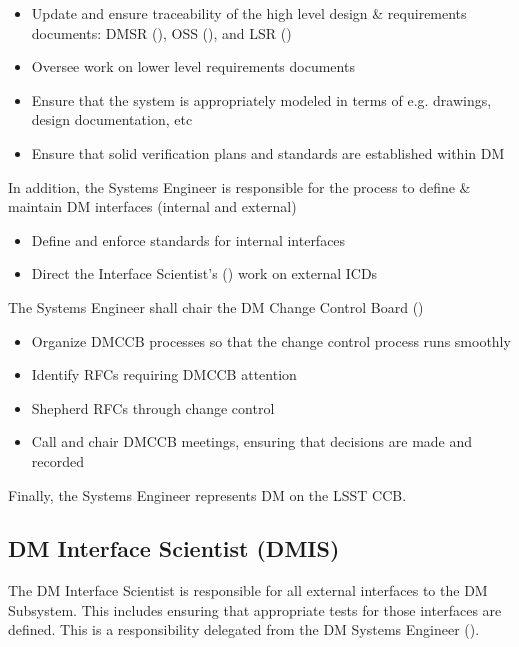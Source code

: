 \begin{itemize}
\item Update and ensure traceability of the high level design \& requirements documents: DMSR (), OSS (), and LSR ()
\item Oversee work on lower level requirements documents
\item Ensure  that the system is appropriately modeled in terms of e.g. drawings, design documentation, etc
\item Ensure  that solid verification plans and standards are established within DM
\end{itemize}

In addition, the Systems Engineer is responsible for the process to define \& maintain DM interfaces (internal and external)

\begin{itemize}
\item Define and enforce standards for internal interfaces
\item Direct the Interface Scientist's () work on external ICDs
\end{itemize}

The Systems Engineer shall chair the DM Change Control Board ()

\begin{itemize}
\item Organize DMCCB processes so that the change control process runs smoothly
\item Identify RFCs requiring DMCCB attention
\item Shepherd RFCs through change control
\item Call and chair DMCCB meetings, ensuring that decisions are made and recorded
\end{itemize}

Finally, the Systems Engineer represents DM on the LSST CCB.

\subsection{DM Interface Scientist (DMIS) \label{role:dmis}}

The DM Interface Scientist is responsible for all external interfaces to the DM Subsystem. This includes ensuring that appropriate tests for those interfaces are defined. This is a responsibility delegated from the DM Systems Engineer ().

